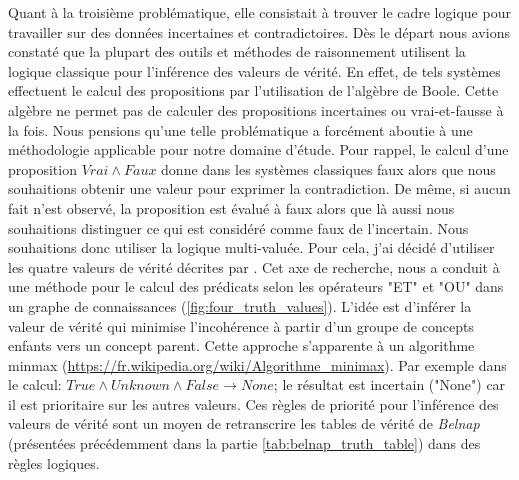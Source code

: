 \begin{refsegment}
Quant à la troisième problématique, elle consistait à trouver le cadre logique pour travailler sur des données incertaines et contradictoires. Dès le départ nous avions constaté que la plupart des outils et méthodes de raisonnement utilisent la logique classique pour l'inférence des valeurs de vérité. En effet, de tels systèmes effectuent le calcul des propositions par l'utilisation de l'algèbre de Boole. Cette algèbre ne permet pas de calculer des propositions incertaines ou vrai-et-fausse à la fois. Nous pensions qu'une telle problématique a forcément aboutie à une méthodologie applicable pour notre domaine d'étude. Pour rappel, le calcul d'une proposition $Vrai \land Faux$ donne dans les systèmes classiques faux alors que nous souhaitions obtenir une valeur pour exprimer la contradiction. De même, si aucun fait n’est observé, la proposition est évalué à faux alors que là aussi nous souhaitions distinguer ce qui est considéré comme faux de l'incertain. Nous souhaitions donc utiliser la logique multi-valuée. Pour cela, j’ai décidé d’utiliser les quatre valeurs de vérité décrites par \citeauthor{belnap77}\cite{belnap77}. Cet axe de recherche, nous a conduit à une méthode pour le calcul des prédicats selon les opérateurs "ET" et "OU" dans un graphe de connaissances (\cref{fig:four_truth_values}). L'idée est d'inférer la valeur de vérité qui minimise l'incohérence à partir  d'un groupe de concepts enfants vers un concept parent. Cette approche s'apparente à un algorithme minmax \cite{aho1989} (\url{https://fr.wikipedia.org/wiki/Algorithme_minimax}). Par exemple dans le calcul: $ True \land Unknown \land False \to None$; le résultat est incertain ("None") car il est prioritaire sur les autres valeurs. Ces règles de priorité pour l'inférence des valeurs de vérité sont un moyen de retranscrire les tables de vérité de \textit{Belnap} (présentées précédemment dans la partie  \cref{tab:belnap_truth_table}) dans des règles logiques.


\end{refsegment}
